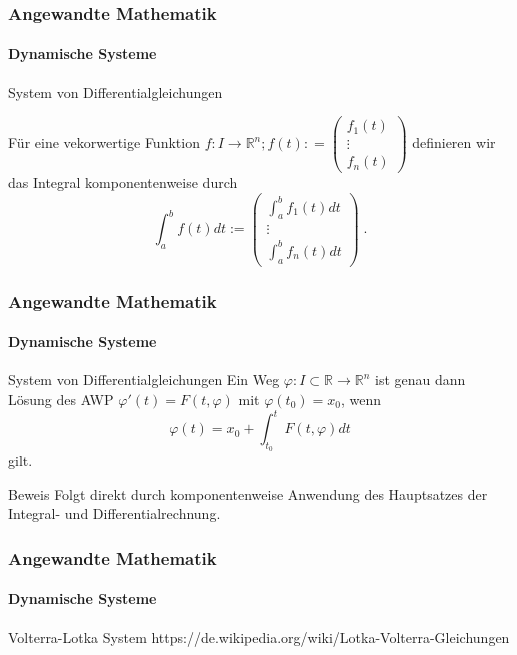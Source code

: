 \documentclass{beamer}
\begin{document}
\begin{frame}
    \frametitle{Angewandte Mathematik}
\framesubtitle{Dynamische Systeme }
\begin{block}{System von Differentialgleichungen}

Für eine  vekorwertige Funktion  $f : I   \to \mathbb{R}^n; f(t) : = \begin{pmatrix} f_1(t)  \\ \vdots \\ f_n(t) \end{pmatrix}$ definieren wir das Integral komponentenweise durch
$$\int_{a}^{b}  f(t) dt := \begin{pmatrix} \int_{a}^{b}  f_1(t) dt  \\ \vdots \\ \int_{a}^{b}  f_n(t) dt \end{pmatrix} \; .$$
\end{block}
 \end{frame}

\begin{frame}
    \frametitle{Angewandte Mathematik}
\framesubtitle{Dynamische Systeme }
\begin{block}{System von Differentialgleichungen}
Ein Weg $\varphi : I \subset \mathbb{R} \to \mathbb{R}^n$ ist genau dann Lösung des AWP $\varphi'(t) = F(t , \varphi)$ mit $ \varphi(t_0)= x_0$, wenn
$$ \varphi(t) =  x_0 + \int_{t_0}^{t} F(t, \varphi) dt$$
gilt.
\end{block}
\begin{block}{Beweis}
Folgt direkt durch komponentenweise Anwendung des Hauptsatzes der Integral- und Differentialrechnung.
\end{block}
 \end{frame}



\begin{frame}
    \frametitle{Angewandte Mathematik}
\framesubtitle{Dynamische Systeme }

\begin{block}{Volterra-Lotka System}
https://de.wikipedia.org/wiki/Lotka-Volterra-Gleichungen
\end{block}
 \end{frame}
\end{document}
